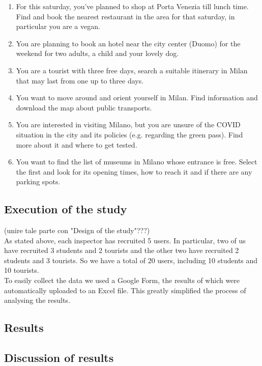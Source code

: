     \begin{enumerate}
        \item For this saturday, you've planned to shop at Porta Venezia till lunch time. Find and book the nearest restaurant in the area for that saturday, in particular you are a vegan.
        \item You are planning to book an hotel near the city center (Duomo) for the weekend for two adults, a child and your lovely dog.
        \item You are a tourist with three free days, search a suitable itinerary in Milan that may last from one up to three days.
        \item You want to move around and orient yourself in Milan. Find information and download the map about public transports.
        \item You are interested in visiting Milano, but you are unsure of the COVID situation in the city and its policies (e.g. regarding the green pass). Find more about it and where to get tested.
        \item You want to find the list of museums in Milano whose entrance is free. Select the first and look for its opening times, how to reach it and if there are any parking spots.
    \end{enumerate}
    
\subsection{Execution of the study}
    (unire tale parte con "Design of the study"???)\\
    As stated above, each inspector has recruited 5 users. In particular, two of us have recruited 3 students and 2 tourists and the other two have recruited 2 students and 3 tourists. So we have a total of 20 users, including 10 students and 10 tourists.\\
    To easily collect the data we used a Google Form, the results of which were automatically uploaded to an Excel file. This greatly simplified the process of analysing the results.

\subsection{Results}

\subsection{Discussion of results}
